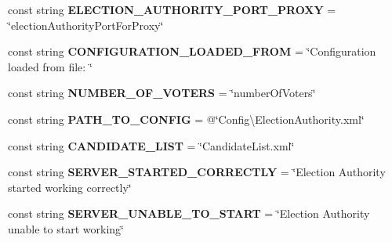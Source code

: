 \begin{DoxyCompactItemize}
\item 
\hypertarget{class_election_authority_1_1_constants_a49313fc45be743d16fb7f75fb86a5e18}{}const string {\bfseries E\+L\+E\+C\+T\+I\+O\+N\+\_\+\+A\+U\+T\+H\+O\+R\+I\+T\+Y\+\_\+\+P\+O\+R\+T\+\_\+\+P\+R\+O\+X\+Y} = \char`\"{}election\+Authority\+Port\+For\+Proxy\char`\"{}\label{class_election_authority_1_1_constants_a49313fc45be743d16fb7f75fb86a5e18}

\item 
\hypertarget{class_election_authority_1_1_constants_a6a91d63b321505807b5fec84994022bb}{}const string {\bfseries C\+O\+N\+F\+I\+G\+U\+R\+A\+T\+I\+O\+N\+\_\+\+L\+O\+A\+D\+E\+D\+\_\+\+F\+R\+O\+M} = \char`\"{}Configuration loaded from file\+: \char`\"{}\label{class_election_authority_1_1_constants_a6a91d63b321505807b5fec84994022bb}

\item 
\hypertarget{class_election_authority_1_1_constants_a7d6511b05d035ac174ae3b0c4873bb87}{}const string {\bfseries N\+U\+M\+B\+E\+R\+\_\+\+O\+F\+\_\+\+V\+O\+T\+E\+R\+S} = \char`\"{}number\+Of\+Voters\char`\"{}\label{class_election_authority_1_1_constants_a7d6511b05d035ac174ae3b0c4873bb87}

\item 
\hypertarget{class_election_authority_1_1_constants_a3f85ebb7470065a57a7ccdf0e5ce3d35}{}const string {\bfseries P\+A\+T\+H\+\_\+\+T\+O\+\_\+\+C\+O\+N\+F\+I\+G} = @\char`\"{}Config\textbackslash{}\+Election\+Authority.\+xml\char`\"{}\label{class_election_authority_1_1_constants_a3f85ebb7470065a57a7ccdf0e5ce3d35}

\item 
\hypertarget{class_election_authority_1_1_constants_adf963e0f80abbb8087eb47063a1a5317}{}const string {\bfseries C\+A\+N\+D\+I\+D\+A\+T\+E\+\_\+\+L\+I\+S\+T} = \char`\"{}Candidate\+List.\+xml\char`\"{}\label{class_election_authority_1_1_constants_adf963e0f80abbb8087eb47063a1a5317}

\item 
\hypertarget{class_election_authority_1_1_constants_aea5ac2a751a33e363c9e6b4438458319}{}const string {\bfseries S\+E\+R\+V\+E\+R\+\_\+\+S\+T\+A\+R\+T\+E\+D\+\_\+\+C\+O\+R\+R\+E\+C\+T\+L\+Y} = \char`\"{}Election Authority started working correctly\char`\"{}\label{class_election_authority_1_1_constants_aea5ac2a751a33e363c9e6b4438458319}

\item 
\hypertarget{class_election_authority_1_1_constants_af9e8ce72d3248d5c45e05c4b94f37bf2}{}const string {\bfseries S\+E\+R\+V\+E\+R\+\_\+\+U\+N\+A\+B\+L\+E\+\_\+\+T\+O\+\_\+\+S\+T\+A\+R\+T} = \char`\"{}Election Authority unable to start working\char`\"{}\label{class_election_authority_1_1_constants_af9e8ce72d3248d5c45e05c4b94f37bf2}


\end{DoxyCompactItemize}
